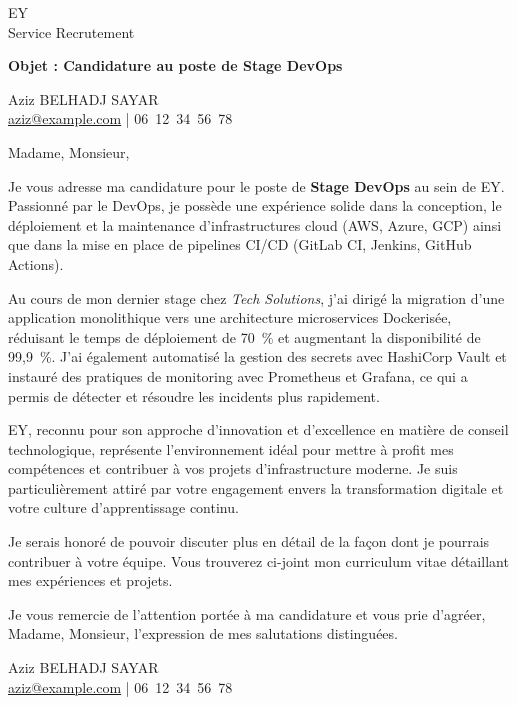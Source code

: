 \documentclass[11pt,a4paper]{letter}
\newcommand{\CandidateName}{Aziz BELHADJ SAYAR}
\newcommand{\CompanyName}{EY}
\newcommand{\Position}{Stage DevOps}
\begin{document}
\begin{letter}{\CompanyName \\ Service Recrutement}

\opening{\color{titlecol}\textbf{Objet : Candidature au poste de \Position}}

\begin{center}
    \color{titlecol}\Large \CandidateName\\[0.5em]
    \href{mailto:aziz@example.com}{aziz@example.com} | 06~12~34~56~78
\end{center}

Madame, Monsieur,

Je vous adresse ma candidature pour le poste de \textbf{\Position} au sein de \CompanyName. Passionné par le DevOps, je possède une expérience solide dans la conception, le déploiement et la maintenance d’infrastructures cloud (AWS, Azure, GCP) ainsi que dans la mise en place de pipelines CI/CD (GitLab CI, Jenkins, GitHub Actions).  

Au cours de mon dernier stage chez \textit{Tech Solutions}, j’ai dirigé la migration d’une application monolithique vers une architecture microservices Dockerisée, réduisant le temps de déploiement de 70~\% et augmentant la disponibilité de 99,9~\%. J’ai également automatisé la gestion des secrets avec HashiCorp Vault et instauré des pratiques de monitoring avec Prometheus et Grafana, ce qui a permis de détecter et résoudre les incidents plus rapidement.

EY, reconnu pour son approche d’innovation et d’excellence en matière de conseil technologique, représente l’environnement idéal pour mettre à profit mes compétences et contribuer à vos projets d’infrastructure moderne. Je suis particulièrement attiré par votre engagement envers la transformation digitale et votre culture d’apprentissage continu.

Je serais honoré de pouvoir discuter plus en détail de la façon dont je pourrais contribuer à votre équipe. Vous trouverez ci-joint mon curriculum vitae détaillant mes expériences et projets.

Je vous remercie de l’attention portée à ma candidature et vous prie d’agréer, Madame, Monsieur, l’expression de mes salutations distinguées.

\closing{\CandidateName\\[0.5em]
\color{footercol}\href{mailto:aziz@example.com}{aziz@example.com} | 06~12~34~56~78}

\end{letter}
\end{document}
